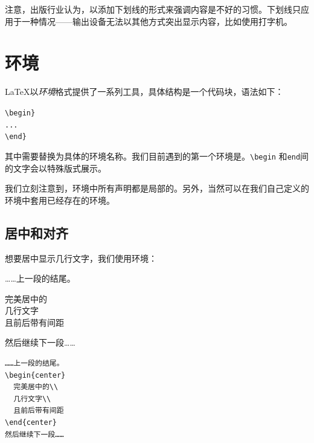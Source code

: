 \begin{origincitation}
    注意，出版行业认为，以添加下划线的形式来强调内容是不好的习惯。下划线只应用于一种情况——输出设备无法以其他方式突出显示内容，比如使用打字机。
\end{origincitation}

\section{环境}

\LaTeX 以\emph{环境}格式提供了一系列工具，具体结构是一个代码块，语法如下：

\begin{dmd}
    \verb+\begin+\verb|}|\\
    \verb|...|\\
    \verb+\end+\verb|}|\\
\end{dmd}

其中需要替换为具体的环境名称。我们目前遇到的第一个环境是。\verb|\begin| 和\verb|end|间的文字会以特殊版式展示。

\begin{exclamation}
    我们立刻注意到，环境中所有声明都是局部的。另外，当然可以在我们自己定义的环境中套用已经存在的环境。
\end{exclamation}

\subsection{居中和对齐}

想要居中显示几行文字，我们使用环境：

\begin{codelist}[2.5]{
    ……上一段的结尾。
    \begin{center}
        完美居中的\\
        几行文字\\
        且前后带有间距
    \end{center}
    然后继续下一段……
}
\begin{verbatim}
……上一段的结尾。
\begin{center}
  完美居中的\\
  几行文字\\
  且前后带有间距
\end{center}
然后继续下一段……\end{verbatim}
\end{codelist}

